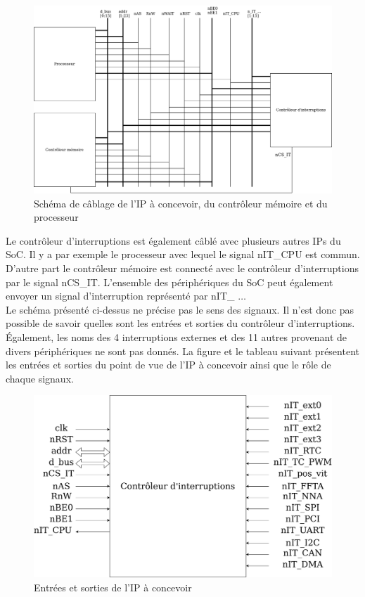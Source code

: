\begin{figure}[H]
	\centering
	\includegraphics[width=1\linewidth]{figure/schema_cablage.png}
	\caption{Schéma de câblage de l'IP à concevoir, du contrôleur mémoire et du processeur}
	\label{fig:schema_cablage}
\end{figure}
	
Le contrôleur d'interruptions est également câblé avec plusieurs autres IPs du SoC.
Il y a par exemple le processeur avec lequel le signal nIT\_CPU est commun.
D'autre part le contrôleur mémoire est connecté avec le contrôleur d'interruptions par le signal nCS\_IT. L'ensemble des périphériques du SoC peut également envoyer un signal d'interruption représenté par nIT\_ $\dots$\\
	
Le schéma présenté ci-dessus ne précise pas le sens des signaux.
Il n'est donc pas possible de savoir quelles sont les entrées et sorties du contrôleur d'interruptions.
Également, les noms des 4 interruptions externes et des 11 autres provenant de divers périphériques ne sont pas donnés.
La figure et le tableau suivant présentent les entrées et sorties du point de vue de l'IP à concevoir ainsi que le rôle de chaque signaux. 
	
\begin{figure}[H]
	\centering
	\includegraphics[width=1\linewidth]{figure/delimitation_systeme.png}
	\caption{Entrées et sorties de l'IP à concevoir}
	\label{fig:inout_ip}
\end{figure}	
	
